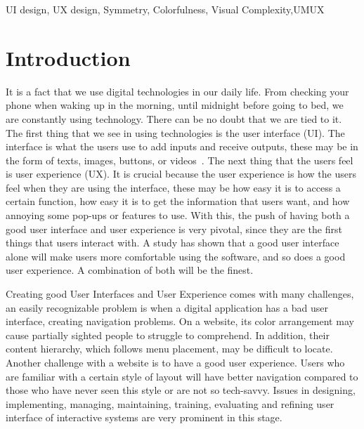 \documentclass[conference]{IEEEtran}
\begin{document}
\begin{IEEEkeywords}
    UI design, UX design, Symmetry, Colorfulness, Visual Complexity,UMUX
\end{IEEEkeywords}

\section{Introduction}


It is a fact that we use digital technologies in our daily life. From checking your phone when waking up in the morning, until midnight before going to bed, we are constantly using technology. There can be no doubt that we are tied to it. The first thing that we see in using technologies is the user interface (UI). The interface is what the users use to add inputs and receive outputs, these may be in the form of texts, images, buttons, or videos~\cite{Gramedia}. The next thing that the users feel is user experience (UX). It is crucial because the user experience is how the users feel when they are using the interface\cite{Gramedia}, these may be how easy it is to access a certain function, how easy it is to get the information that users want, and how annoying some pop-ups or features to use. With this, the push of having both a good user interface and user experience is very pivotal, since they are the first things that users interact with. A study has shown that a good user interface alone will make users more comfortable using the software, and so does a good user experience\cite{Watulingas}. A combination of both will be the finest\cite{Watulingas}.

Creating good User Interfaces and User Experience comes with many challenges, an easily recognizable problem is when a digital application has a bad user interface, creating navigation problems. On a website, its color arrangement may cause partially sighted people to struggle to comprehend. In addition, their content hierarchy, which follows menu placement, may be difficult to locate. Another challenge with a website is to have a good user experience. Users who are familiar with a certain style of layout will have better navigation compared to those who have never seen this style or are not so tech-savvy. Issues in designing, implementing, managing, maintaining, training, evaluating and refining user interface of interactive systems are very prominent in this stage\cite{Shneiderman1987}.
\end{document}
